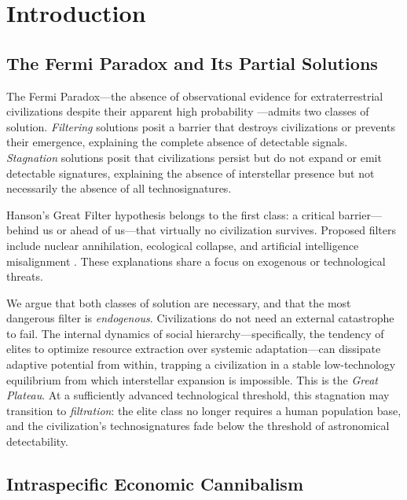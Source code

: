 \section{Introduction}

\subsection{The Fermi Paradox and Its Partial Solutions}

The Fermi Paradox---the absence of observational evidence for extraterrestrial civilizations despite their apparent high probability \cite{hart1975}---admits two classes of solution. \emph{Filtering} solutions posit a barrier that destroys civilizations or prevents their emergence, explaining the complete absence of detectable signals. \emph{Stagnation} solutions posit that civilizations persist but do not expand or emit detectable signatures, explaining the absence of interstellar presence but not necessarily the absence of all technosignatures.

Hanson's Great Filter hypothesis \cite{hanson1998} belongs to the first class: a critical barrier---behind us or ahead of us---that virtually no civilization survives. Proposed filters include nuclear annihilation, ecological collapse, and artificial intelligence misalignment \cite{bostrom2002,bostrom2014}. These explanations share a focus on exogenous or technological threats.

We argue that both classes of solution are necessary, and that the most dangerous filter is \emph{endogenous}. Civilizations do not need an external catastrophe to fail. The internal dynamics of social hierarchy---specifically, the tendency of elites to optimize resource extraction over systemic adaptation---can dissipate adaptive potential from within, trapping a civilization in a stable low-technology equilibrium from which interstellar expansion is impossible. This is the \emph{Great Plateau}. At a sufficiently advanced technological threshold, this stagnation may transition to \emph{filtration}: the elite class no longer requires a human population base, and the civilization's technosignatures fade below the threshold of astronomical detectability.

\subsection{Intraspecific Economic Cannibalism}

